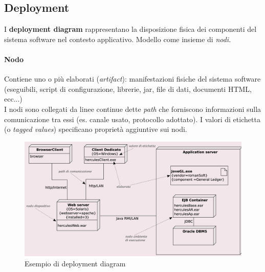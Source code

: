 \subsection{Deployment}

I \textbf{deployment diagram} rappresentano la disposizione fisica dei componenti del sistema software nel contesto applicativo. Modello come insieme di \textit{nodi}.

\paragraph{Nodo} Contiene uno o più elaborati (\textit{artifact}): manifestazioni fisiche del sistema software (eseguibili, script di configurazione, librerie, jar, file di dati, documenti HTML, ecc...)\\
I nodi sono collegati da linee continue dette \textit{path} che forniscono informazioni sulla comunicazione tra essi (es. canale usato, protocollo adottato). I valori di etichetta (o \textit{tagged values}) specificano proprietà aggiuntive sui nodi.

\begin{figure}[h!]
    \centering
    \includegraphics[width=0.75\linewidth]{assets/UML/deployment/deployment.png}
    \caption{Esempio di deployment diagram}
\end{figure}

\newpage